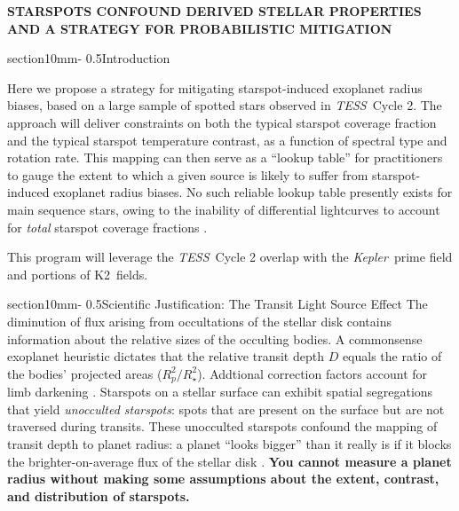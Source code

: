 \documentclass[letterpaper,11pt]{article}
\makeatletter
\renewcommand{\section}{\@startsection%
{section}{1}{0mm}{-\baselineskip}%
{0.5\baselineskip}{\normalfont\Large\bfseries}}%
\newcommand{\tess}{{\it TESS}}
\newcommand{\kepler}{{\it Kepler}}
\newcommand{\ktwo}{{K2}}
\makeatother
\begin{document}
\pagestyle{plain}
\setlength{\bibsep}{0.0pt}
\let\oldbibliography\thebibliography
\renewcommand{\thebibliography}[1]{%
  \oldbibliography{#1}%
  \setlength{\itemsep}{0pt}%
}




\begin{center}
\bfseries\uppercase{%
Starspots confound derived stellar properties and a strategy for probabilistic mitigation
}
\end{center}




\section{Introduction}

Here we propose a strategy for mitigating starspot-induced exoplanet radius biases, based on a large sample of spotted stars observed in \tess\ Cycle 2.  The approach will deliver constraints on both the typical starspot coverage fraction and the typical starspot temperature contrast, as a function of spectral type and rotation rate.  This mapping can then serve as a ``lookup table'' for practitioners to gauge the extent to which a given source is likely to suffer from starspot-induced exoplanet radius biases.  No such reliable lookup table presently exists for main sequence stars, owing to the inability of differential lightcurves to account for \emph{total} starspot coverage fractions \citep{2018ApJ...865..142B}.

This program will leverage the \tess\ Cycle 2 overlap with the \kepler\ prime field and portions of \ktwo\ fields.

\section{Scientific Justification: The Transit Light Source Effect}
The diminution of flux arising from occultations of the stellar disk contains information about the relative sizes of the occulting bodies.  A commonsense exoplanet heuristic dictates that the relative transit depth $D$ equals the ratio of the bodies' projected areas ($R_p^2/R_\star^2$).  Addtional correction factors account for limb darkening \citep{2002ApJ...580L.171M}.  Starspots on a stellar surface can exhibit spatial segregations
that yield \emph{unocculted starspots}: spots that are present on the surface but are not traversed during transits.  These unocculted starspots confound the mapping of transit depth to planet radius: a planet ``looks bigger'' than it really is if it blocks the brighter-on-average flux of the stellar disk \citep{2018AJ....156...91M}.  \textbf{You cannot measure a planet radius without making some assumptions about the extent, contrast, and distribution of starspots.}
\end{document}
